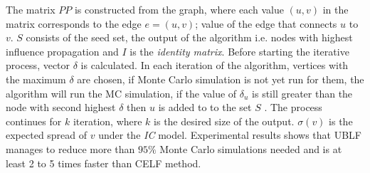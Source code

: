 \documentclass[english]{tktltiki}
\begin{document}
The matrix $PP$ is constructed from the graph, where each value $(u,v)$ in the matrix corresponds to the edge $e=(u,v)$; value of the edge that connects $u$ to $v$. $S$ consists of the seed set, the output of the algorithm i.e. nodes with highest influence propagation and $I$ is the \textit{identity matrix}. Before starting the iterative process, vector $\delta$ is calculated. In each iteration of the algorithm, vertices with the maximum $\delta$ are chosen, if Monte Carlo simulation is not yet run for them, the algorithm will run the MC simulation, if the value of $\delta_u$ is still greater than the node with second highest $\delta$ then $u$ is added to to the set $S$ . The process continues for $k$ iteration, where $k$ is the desired size of the output. $\sigma(v)$ is the expected spread of $v$ under the \textit{IC} model. Experimental results shows that UBLF manages to reduce more than $95\%$ Monte Carlo simulations needed and is at least 2 to 5 times faster than CELF method.
\end{document}
